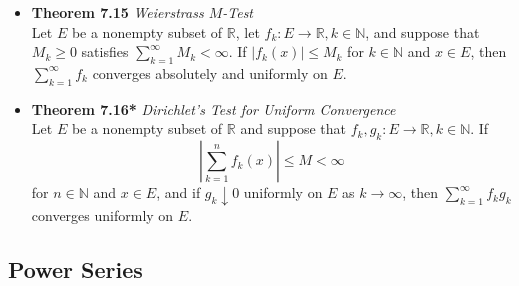 \documentclass[11pt,a4paper]{article}
\begin{document}
\begin{itemize}
    \item \textbf{Theorem 7.15} \emph{Weierstrass $M$-Test} \\
        Let $E$ be a nonempty subset of $\mathbb{R}$,
        let $f_k : E \to \mathbb{R}, k \in \mathbb{N}$,
        and suppose that $M_k \geq 0$ satisfies $\sum_{k=1}^\infty M_k < \infty$.
        If $|f_k(x)| \leq M_k$ for $k \in \mathbb{N}$ and $x \in E$, then
        $\sum_{k=1}^\infty f_k$ converges absolutely and uniformly on $E$.

    \item \textbf{Theorem 7.16*} \emph{Dirichlet's Test for Uniform Convergence} \\
        Let $E$ be a nonempty subset of $\mathbb{R}$ and suppose that
        $f_k, g_k : E \to \mathbb{R}, k \in \mathbb{N}$.
        If
        \[
            \left| \sum_{k=1}^n f_k(x) \right| \leq M < \infty
        \]
        for $n \in \mathbb{N}$ and $x \in E$, and if $g_k \downarrow 0$ uniformly on $E$
        as $k \to \infty$, then $\sum_{k=1}^\infty f_k g_k$ converges uniformly on $E$.
\end{itemize}

\subsection{Power Series}
\end{document}
